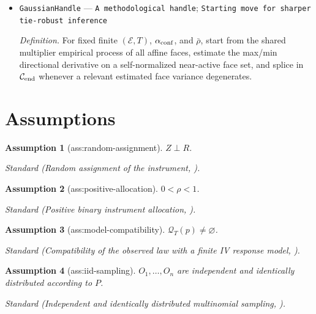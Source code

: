 \documentclass{article}
\newtheorem{assumption}{Assumption}
\begin{document}
\begin{itemize}
  \par\smallskip\noindent\emph{Definition.} For \(\mathcal C=[l_{\rm lo},l_{\rm hi}]\times[u_{\rm lo},u_{\rm hi}]\), set \(w_{\rm tot}(\mathcal C)=(l_{\rm hi}-l_{\rm lo})+(u_{\rm hi}-u_{\rm lo})\).
  \item \texttt{GaussianHandle} --- \texttt{A methodological handle}; \texttt{Starting move for sharper tie-\allowbreak{}robust inference}
  \par\smallskip\noindent\emph{Definition.} For fixed finite \((\mathcal E,T)\), \(\alpha_{\rm conf}\), and \(\bar\rho\), start from the shared multiplier empirical process of all affine faces, estimate the max/min directional derivative on a self-normalized near-active face set, and splice in \(\mathcal C_{\rm end}\) whenever a relevant estimated face variance degenerates.
\end{itemize}

\section{Assumptions}

\begin{assumption}[ass:random-assignment]\label{ass:random-assignment}
\(Z\perp R\).
\par\smallskip\noindent\emph{Standard} (Random assignment of the instrument, \cite{BalkePearl1997ImperfectCompliance}).
\end{assumption}

\begin{assumption}[ass:positive-allocation]\label{ass:positive-allocation}
\(0<\rho<1\).
\par\smallskip\noindent\emph{Standard} (Positive binary instrument allocation, \cite{BalkePearl1997ImperfectCompliance}).
\end{assumption}

\begin{assumption}[ass:model-compatibility]\label{ass:model-compatibility}
\(\mathcal Q_T(p)\neq\varnothing\).
\par\smallskip\noindent\emph{Standard} (Compatibility of the observed law with a finite IV response model, \cite{SongGuoChanRichardson2026CategoricalIV}).
\end{assumption}

\begin{assumption}[ass:iid-sampling]\label{ass:iid-sampling}
\(O_1,\ldots,O_n\) are independent and identically distributed according to \(P\).
\par\smallskip\noindent\emph{Standard} (Independent and identically distributed multinomial sampling, \cite{SongGuoChanRichardson2026CategoricalIV}).
\end{assumption}
\end{document}
